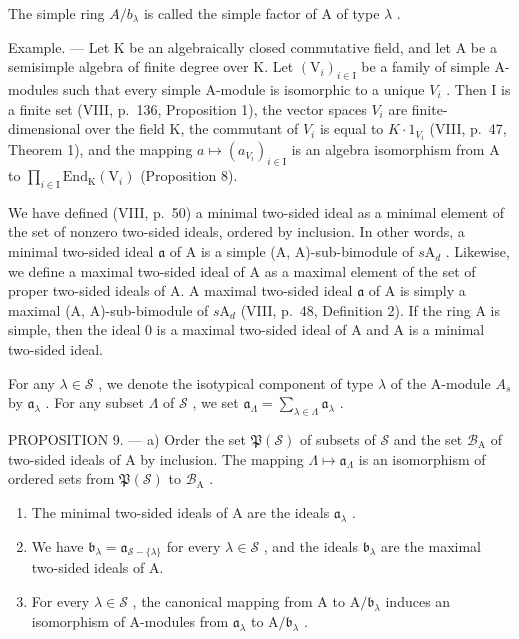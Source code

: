 The simple ring \(A/b_{\lambda}\) is called the simple factor of A of type \(\lambda\) .

Example. --- Let K be an algebraically closed commutative field, and let A be a semisimple algebra of finite degree over K. Let \((\mathrm{V}_{i})_{i\in\mathrm{I}}\) be a family of simple A-modules such that every simple A-module is isomorphic to a unique \(V_{i}\) . Then I is a finite set (VIII, p.~136, Proposition 1), the vector spaces \(V_{i}\) are finite-dimensional over the field K, the commutant of \(V_{i}\) is equal to \(K\cdot1_{V_{i}}\) (VIII, p.~47, Theorem 1), and the mapping \(a\mapsto(a_{V_{i}})_{i\in\mathrm{I}}\) is an algebra isomorphism from A to \(\prod_{i\in\mathrm{I}}\mathrm{End}_{\mathrm{K}}(\mathrm{V}_{i})\) (Proposition 8).

We have defined (VIII, p.~50) a minimal two-sided ideal as a minimal element of the set of nonzero two-sided ideals, ordered by inclusion. In other words, a minimal two-sided ideal \(\mathfrak{a}\) of A is a simple (A, A)-sub-bimodule of \(s\mathrm{A}_d\) . Likewise, we define a maximal two-sided ideal of A as a maximal element of the set of proper two-sided ideals of A. A maximal two-sided ideal \(\mathfrak{a}\) of A is simply a maximal (A, A)-sub-bimodule of \(s\mathrm{A}_d\) (VIII, p.~48, Definition 2). If the ring A is simple, then the ideal 0 is a maximal two-sided ideal of A and A is a minimal two-sided ideal.

For any \(\lambda \in \mathcal{S}\) , we denote the isotypical component of type \(\lambda\) of the A-module \(A_s\) by \(\mathfrak{a}_{\lambda}\) . For any subset \(\Lambda\) of \(\mathcal{S}\) , we set \(\mathfrak{a}_{\Lambda} = \sum_{\lambda \in \Lambda} \mathfrak{a}_{\lambda}\) .

PROPOSITION 9. --- a) Order the set \(\mathfrak{P}(\mathcal{S})\) of subsets of \(\mathcal{S}\) and the set \(\mathcal{B}_{\mathrm{A}}\) of two-sided ideals of A by inclusion. The mapping \(\Lambda \mapsto \mathfrak{a}_{\Lambda}\) is an isomorphism of ordered sets from \(\mathfrak{P}(\mathcal{S})\) to \(\mathcal{B}_{\mathrm{A}}\) .

\begin{enumerate}
\def\labelenumi{\alph{enumi})}
\setcounter{enumi}{1}
\item
  The minimal two-sided ideals of A are the ideals \(\mathfrak{a}_{\lambda}\) .
\item
  We have \(\mathfrak{b}_{\lambda} = \mathfrak{a}_{\mathcal{S} - \{\lambda\}}\) for every \(\lambda \in \mathcal{S}\) , and the ideals \(\mathfrak{b}_{\lambda}\) are the maximal two-sided ideals of A.
\item
  For every \(\lambda \in \mathcal{S}\) , the canonical mapping from A to \(\mathrm{A} / \mathfrak{b}_{\lambda}\) induces an isomorphism of A-modules from \(\mathfrak{a}_{\lambda}\) to \(\mathrm{A} / \mathfrak{b}_{\lambda}\) .
\end{enumerate}

